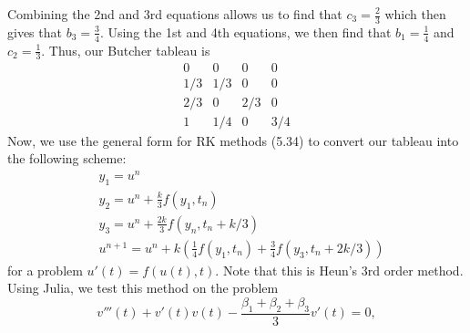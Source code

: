 \documentclass{article}
\begin{document}
Combining the 2nd and 3rd equations allows us to find that $c_3=\frac{2}{3}$ which then gives that $b_3=\frac{3}{4}$. Using the 1st and 4th equations, we then find that $b_1=\frac{1}{4}$ and $c_2=\frac{1}{3}$. Thus, our Butcher tableau is
\[
\renewcommand\arraystretch{1.2}
\begin{array}
	{c|ccc}
	0 & 0&0&0\\
	1/3 &1/3 &0 &0\\
	2/3 &0 &2/3 &0\\
	\hline
	1& 1/4 &0 &3/4
\end{array}
\]
Now, we use the general form for RK methods (5.34) to convert our tableau into the following scheme:
\begin{align*}
	&y_1=u^n\\
	&y_2=u^n+\frac{k}{3}f(y_1,t_n)\\
	&y_3=u^n+\frac{2k}{3}f(y_n,t_n+k/3)\\
	&u^{n+1}=u^n+k\left(\frac{1}{4}f(y_1,t_n)+\frac{3}{4}f(y_3,t_n+2k/3)\right) 
\end{align*}
for a problem $u'(t)=f(u(t),t)$. Note that this is Heun's 3rd order method. \\ 
Using Julia, we test this method on the problem $$ v'''(t) + v'(t) v(t) - \frac{\beta_1 + \beta_2 + \beta_3}{3} v'(t) =0, $$
\end{document}

